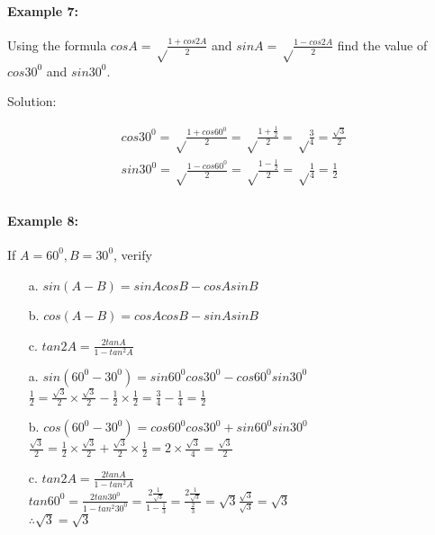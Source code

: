 \documentclass{article}
\begin{document}
\paragraph{Example 7:}
Using the formula $cos A = \sqrt\frac{1+cos2A}{2}$ and $sin A = \sqrt\frac{1-cos2A}{2}$
find the value of $cos30^{0}$ and $sin30^{0}$.

{\small Solution:}

\[
  \begin{aligned}
    cos30^{0} = \sqrt\frac{1+cos60^{0}}{2} =  \sqrt\frac{1+\frac{1}{2}}{2} = \sqrt\frac{3}{4} = \frac{\sqrt{3}}{2} \\
    sin30^{0} = \sqrt\frac{1-cos60^{0}}{2} =  \sqrt\frac{1-\frac{1}{2}}{2} = \sqrt\frac{1}{4} = \frac{1}{2} \\
  \end{aligned}
\]

\paragraph{Example 8:}
If $A = 60^{0}, B = 30^{0}$, verify

\begin{enumerate}
  \item[a.] $sin(A-B) = sinA cosB - cosA sinB$
  \item[b.] $cos(A-B) = cosA cosB - sinA sinB$
  \item[c.] $tan2A = \frac{2tanA}{1-tan^{2}A}$
  \item[a.] $sin(60^{0}-30^{0}) = sin60^{0}cos30^{0} - cos60^{0}sin30^{0}$ \\
        $ \frac{1}{2} = \frac{\sqrt{3}}{2} \times \frac{\sqrt{3}}{2} - \frac{1}{2} \times \frac{1}{2} = \frac{3}{4} - \frac{1}{4} = \frac{1}{2} $
  \item[b.] $cos(60^{0}-30^{0}) = cos60^{0}cos30^{0} + sin60^{0}sin30^{0}$ \\
        $ \frac{\sqrt{3}}{2} = \frac{1}{2} \times \frac{\sqrt{3}}{2} + \frac{\sqrt{3}}{2} \times \frac{1}{2} = 2 \times \frac{\sqrt{3}}{4} = \frac{\sqrt{3}}{2}$
  \item[c.] $tan2A = \frac{2tanA}{1-tan^{2}A}$ \\
        $ tan 60^{0} = \frac{2tan30^{0}}{1-tan^{2}30^{0}} = \frac{2\frac{1}{\sqrt{3}}}{1-\frac{1}{3}} = \frac{2\frac{1}{\sqrt{3}}}{\frac{2}{3}} = \sqrt{3} \frac{\sqrt{3}}{\sqrt{3}} = \sqrt{3}$ \\
        $\therefore \sqrt{3} = \sqrt{3}$
\end{enumerate}
\end{document}
